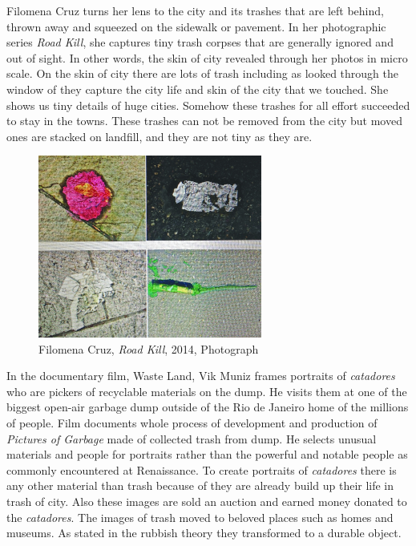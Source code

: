 Filomena Cruz turns her lens to the city and its trashes that are left behind, thrown away and squeezed on the sidewalk or pavement. In her photographic series \textit{Road Kill}, she captures tiny trash corpses that are generally ignored and out of sight. In other words, the skin of city revealed through her photos in micro scale. On the skin of city there are lots of trash including  as looked through the window of they capture the city life and skin of the city that we touched. She shows us tiny details of huge cities. Somehow these trashes for all effort succeeded to stay in the towns. These trashes can not be removed from the city but moved ones are stacked on landfill, and they are not tiny as they are.

\begin{figure}[h!]
  \centering
  \includegraphics[height=6cm]{graphics/FilomenaCruz_RoadKill_ReVista.jpg}
  \caption{Filomena Cruz, \textit{Road Kill}, 2014, Photograph}
  \label{fig:FilomenaCruz_RoadKill_ReVista}
\end{figure}

In the documentary film, Waste Land, Vik Muniz frames portraits of \textit{catadores} who are pickers of recyclable materials on the dump. He visits them at one of the biggest open-air garbage dump outside of the Rio de Janeiro home of the millions of people. Film documents whole process of development and production of \textit{Pictures of Garbage} made of collected trash from dump. He selects unusual materials and people for portraits rather than the powerful and notable people as commonly encountered at Renaissance. To create portraits of \textit{catadores} there is any other material than trash because of they are already build up their life in trash of city. Also these images are sold an auction and earned money donated to the \textit{catadores}. The images of trash moved to beloved places such as homes and museums. As stated in the rubbish theory they transformed to a durable object.

